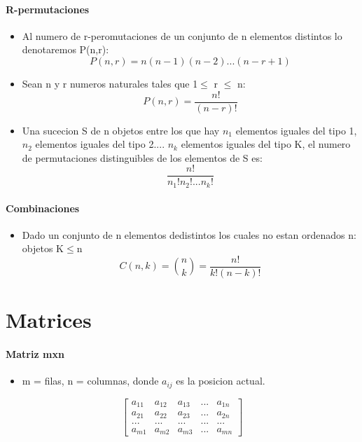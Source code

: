 \documentclass[a4paper]{article}
\begin{document}
\paragraph{R-permutaciones}
\begin{itemize}
	\item Al numero de r-peromutaciones de un conjunto de n elementos distintos lo denotaremos P(n,r):
	\begin{equation*}
		P(n,r) = n(n-1)(n-2)...(n-r+1)
	\end{equation*}

	\item Sean n y r numeros naturales tales que 1$\leq$ r $\leq$ n:
	\begin{equation*}
		P(n,r)= \dfrac{n!}{(n-r)!}
	\end{equation*}

	\item Una sucecion S de n objetos entre los que hay $n_1$ elementos iguales del tipo 1, $n_2$ elementos iguales del tipo 2.... $n_k$ elementos iguales del tipo K, el numero de permutaciones distinguibles de los elementos de S es:
	\begin{equation*}
		\dfrac{n!}{n_1!n_2!...n_k!}
	\end{equation*}
\end{itemize}

\paragraph{Combinaciones}
\begin{itemize}
	\item Dado un conjunto de n elementos dedistintos los cuales no estan ordenados n: objetos K$\leq$n
	\begin{equation}
		C(n,k) = \binom n k  = \dfrac{n!}{k!(n-k)!}
	\end{equation}
\end{itemize}

\section{Matrices}

\paragraph{Matriz mxn}

\begin{itemize}
	\item m = filas, n = columnas, donde $a_{ij}$ es la posicion actual.
\end{itemize}
\begin{equation}
\left[ 
\begin{array}{ccccc}
	a_{11} & a_{12} & a_{13} & ... & a_{1n} \\
	a_{21} & a_{22} & a_{23} & ... & a_{2n} \\
	... & ... & ... & ... & ... \\
	a_{m1} & a_{m2} & a_{m3} & ... & a_{mn}
\end{array}
\right] 
\end{equation}
 
\end{document}
